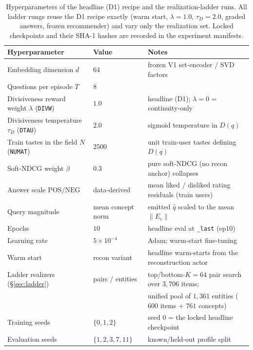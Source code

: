 \documentclass[11pt]{article}
\begin{document}
\begin{table}[t]\centering
\begin{tabular}{lll}
\toprule
Hyperparameter & Value & Notes \\
\midrule
Embedding dimension $d$ & $64$ & frozen V1 set-encoder / SVD factors \\
Questions per episode $T$ & $8$ & \\
Divisiveness reward weight $\lambda$ (\texttt{DIVW}) & $1.0$ & headline (D1); $\lambda{=}0$ = continuity-only \\
Divisiveness temperature $\tau_D$ (\texttt{DTAU}) & $2.0$ & sigmoid temperature in $D(q)$ \\
Train tastes in the field $N$ (\texttt{NUMAT}) & $2500$ & unit train-user tastes defining $D(q)$ \\
Soft-NDCG weight $\beta$ & $0.3$ & pure soft-NDCG (no recon anchor) collapses \\
Answer scale $\mathrm{POS}/\mathrm{NEG}$ & data-derived & mean liked / disliked rating residuals (train users) \\
Query magnitude & mean concept norm & emitted $\hat q$ scaled to the mean $\|E_c\|$ \\
Epochs & $10$ & headline eval at \texttt{\_last} (ep10) \\
Learning rate & $5\times10^{-4}$ & Adam; warm-start fine-tuning \\
Warm start & recon variant & headline warm-starts from the reconstruction actor \\
Ladder realizers (\S\ref{sec:ladder}) & pairs / entities & top/bottom-$K{=}64$ pair search over $3{,}706$ items; \\
 & & unified pool of $1{,}361$ entities ($600$ items $+$ $761$ concepts) \\
Training seeds & $\{0,1,2\}$ & seed $0$ = the locked headline checkpoint \\
Evaluation seeds & $\{1,2,3,7,11\}$ & known/held-out profile split \\
\bottomrule
\end{tabular}
\caption{Hyperparameters of the headline (D1) recipe and the realization-ladder runs. All ladder rungs reuse the D1
recipe exactly (warm start, $\lambda{=}1.0$, $\tau_D{=}2.0$, graded answers, frozen recommender) and vary only the
realization set. Locked checkpoints and their SHA-1 hashes are recorded in the experiment manifests.}\label{tab:hyper}
\end{table}
\end{document}
